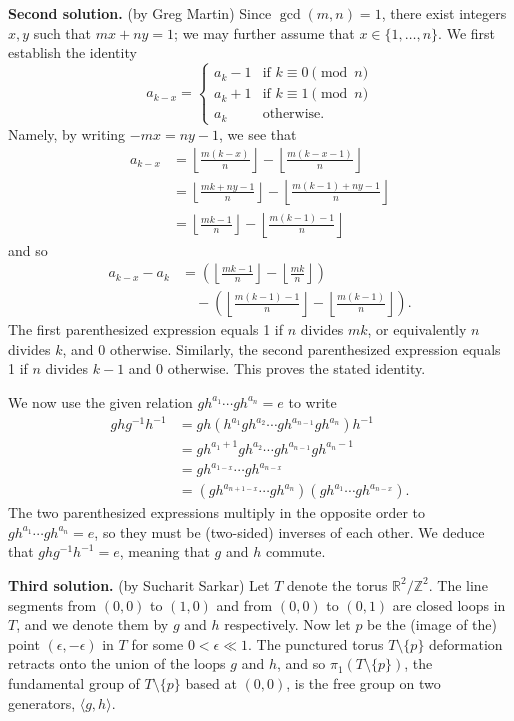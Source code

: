 \documentclass[amssymb,twocolumn,pra,10pt,aps]{revtex4-1}
\begin{document}
\begin{itemize}
\noindent
\textbf{Second solution.} (by Greg Martin)
Since $\gcd(m,n) = 1$, there exist integers $x,y$ such that $mx + ny = 1$; we may further assume that 
$x \in \{1,\dots,n\}$. We first establish the identity
\[
a_{k-x} = \begin{cases}
a_k - 1 & \mbox{if $k \equiv 0 \pmod{n}$} \\
a_k + 1 & \mbox{if $k \equiv 1 \pmod{n}$} \\
a_k & \mbox{otherwise}.
\end{cases}
\]
Namely, by writing $-mx = ny-1$, we see that
\begin{align*}
a_{k-x} &= \left\lfloor \frac{m(k-x)}{n} \right\rfloor - \left\lfloor \frac{m(k-x-1)}{n} \right\rfloor
\\
&= \left\lfloor \frac{mk+ny-1}{n} \right\rfloor - \left\lfloor \frac{m(k-1)+ny-1}{n} \right\rfloor \\
&= \left\lfloor \frac{mk-1}{n} \right\rfloor - \left\lfloor \frac{m(k-1)-1}{n} \right\rfloor
\end{align*}
and so
\begin{align*}
a_{k-x} - a_k &= \left( \left\lfloor \frac{mk-1}{n} \right\rfloor - \left\lfloor \frac{mk}{n} \right\rfloor \right)
\\
&\quad
- \left( \left\lfloor \frac{m(k-1)-1}{n} \right\rfloor - \left\lfloor \frac{m(k-1)}{n} \right\rfloor \right).
\end{align*}
The first parenthesized expression equals 1 if $n$ divides $mk$, or equivalently $n$ divides $k$, and 0 otherwise.
Similarly, the second parenthesized expression equals 1 if $n$ divides $k-1$ and 0 otherwise. This proves the stated identity.

We now use the given relation $g h^{a_1} \cdots g h^{a_n} = e$ to write
\begin{align*}
ghg^{-1}h^{-1} &= gh(h^{a_1} g h^{a_2} \cdots gh^{a_{n-1}} g h^{a_n})h^{-1} \\
&= gh^{a_1+1} gh^{a_2} \cdots gh^{a_{n-1}} gh^{a_n-1} \\
&= gh^{a_{1-x}} \cdots gh^{a_{n-x}} \\
&= (gh^{a_{n+1-x}} \cdots gh^{a_{n}}) (gh^{a_1} \cdots gh^{a_{n-x}}).
\end{align*}
The two parenthesized expressions multiply in the opposite order to $g h^{a_1} \cdots g h^{a_n} = e$, so they must be
(two-sided) inverses of each other. We deduce that $ghg^{-1} h^{-1} = e$, meaning that $g$ and $h$ commute.

\noindent
\textbf{Third solution.} (by Sucharit Sarkar)
Let $T$ denote the torus $\mathbb{R}^2/\mathbb{Z}^2$. The line segments from $(0,0)$ to $(1,0)$ and from $(0,0)$ to $(0,1)$ are closed loops in $T$, and we denote them by $g$ and $h$ respectively. Now let $p$ be the (image of the) point $(\epsilon,-\epsilon)$ in $T$ for some $0<\epsilon\ll 1$. The punctured torus $T \setminus \{p\}$ deformation retracts onto the union of the loops $g$ and $h$, and so $\pi_1(T\setminus\{p\})$, the fundamental group of $T\setminus\{p\}$ based at $(0,0)$, is the free group on two generators, $\langle g,h\rangle$.


\end{itemize}
\end{document}
